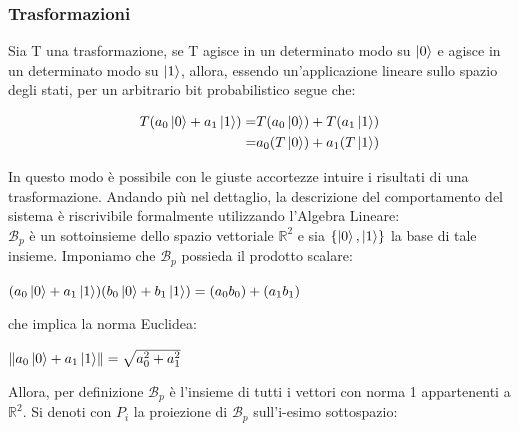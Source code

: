 \documentclass[12pt,a4paper,openright]{report}
\newcommand{\norm}[1]{\left\lVert#1\right\rVert}
\begin{document}
\subsubsection{Trasformazioni}
Sia T una trasformazione, se T agisce in un determinato modo su $\ket0$
e agisce in un determinato modo su $\ket1$, allora, essendo un'applicazione lineare sullo spazio degli stati, per un arbitrario bit probabilistico segue che:
\begin{center}
    \begin{align*}
        T(a_0\ket0 + a_1\ket1)=& T(a_0\ket0) + T(a_1\ket1)\\ =& a_0(T\ket0) + a_1(T\ket1)
    \end{align*}
\end{center}
In questo modo è possibile con le giuste accortezze intuire i risultati di una trasformazione. Andando più nel dettaglio, la descrizione 
del comportamento del sistema è riscrivibile formalmente utilizzando l'Algebra Lineare:\\
$\mathcal{B}_p$ è un sottoinsieme dello spazio vettoriale ${\mathbb{R}^2}$ e sia $\{\ket0,\ket1 \}$ la base di tale insieme. Imponiamo che $\mathcal{B}_p$
possieda il prodotto scalare:
\begin{center}
    $(a_0\ket0 + a_1\ket1)(b_0\ket0 + b_1\ket1) = (a_0b_0) + (a_1b_1)$
\end{center}
che implica la norma Euclidea:
\begin{center}
    $\norm{a_0\ket0 + a_1\ket1}=\sqrt{a_0^2+a_1^2}$
\end{center}
Allora, per definizione $\mathcal{B}_p$ è l'insieme di tutti i vettori con norma 1 appartenenti a ${\mathbb{R}^2}$. Si denoti con $P_i$ la proiezione
di $\mathcal{B}_p$ sull'i-esimo sottospazio:
    
\end{document}
